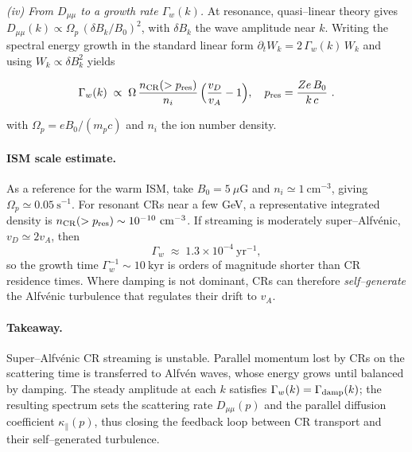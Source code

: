 \emph{(iv) From \(D_{\mu\mu}\) to a growth rate \(\Gamma_w(k)\).}
At resonance, quasi–linear theory gives
\(D_{\mu\mu}(k)\propto \Omega_p\,(\delta B_k/B_0)^2\), with \(\delta B_k\) the wave amplitude near \(k\).
Writing the spectral energy growth in the standard linear form
\(\partial_t W_k=2\,\Gamma_w(k)\,W_k\) and using \(W_k\propto \delta B_k^2\) yields
\begin{remark}
\[
\Gamma_w(k)
\;\propto\;
\Omega\,
\frac{n_{\rm CR}(>p_{\rm res})}{n_i}\,
\Bigl(\frac{v_D}{v_A}-1\Bigr),
\quad
p_{\rm res}=\frac{Ze\,B_0}{k\,c}~.
\]
\end{remark}
%
with \(\Omega_p=eB_0/(m_pc)\) and \(n_i\) the ion number density.


\paragraph{ISM scale estimate.}
As a reference for the warm ISM, take \(B_0=5~\mu\mathrm{G}\) and \(n_i\simeq
1~\mathrm{cm^{-3}}\), giving \(\Omega_p\simeq 0.05~\mathrm{s^{-1}}\).
For resonant CRs near a few GeV, a representative integrated density is
\(n_{\rm CR}(>p_{\rm res})\sim 10^{-10}~\mathrm{cm^{-3}}\).
If streaming is moderately super–Alfv\'enic, \(v_D\simeq 2v_A\), then
\[
\Gamma_w \;\approx\; 1.3\times10^{-4}~\mathrm{yr^{-1}},
\]
so the growth time \(\Gamma_w^{-1}\sim 10~\mathrm{kyr}\) is orders of magnitude shorter
than CR residence times. Where damping is not dominant, CRs can therefore
\emph{self–generate} the Alfv\'enic turbulence that regulates their drift to \(v_A\).

\paragraph{Takeaway.}
Super–Alfv\'enic CR streaming is unstable. Parallel momentum lost by CRs on the
scattering time is transferred to Alfv\'en waves, whose energy grows until balanced by
damping. The steady amplitude at each \(k\) satisfies
\(\Gamma_w(k)=\Gamma_{\rm damp}(k)\); the resulting spectrum sets the scattering rate
\(D_{\mu\mu}(p)\) and the parallel diffusion coefficient \(\kappa_\parallel(p)\), thus
closing the feedback loop between CR transport and their self–generated turbulence.




